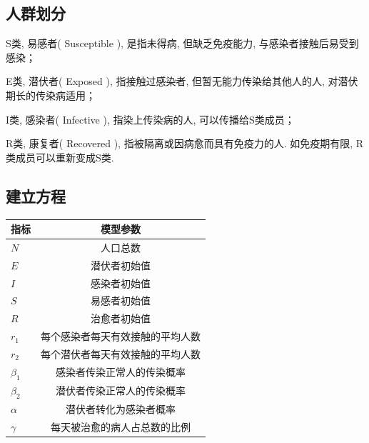 \documentclass[lang=cn,11pt]{elegantpaper}
\begin{document}
\subsection{人群划分}
S类, 易感者( Susceptible ), 是指未得病, 但缺乏免疫能力, 与感染者接触后易受到感染；

E类, 潜伏者( Exposed ), 指接触过感染者, 但暂无能力传染给其他人的人, 对潜伏期长的传染病适用；

I类, 感染者( Infective ), 指染上传染病的人, 可以传播给S类成员；

R类, 康复者( Recovered ), 指被隔离或因病愈而具有免疫力的人. 如免疫期有限, R类成员可以重新变成S类.



\subsection{建立方程}
\begin{center}	
    \begin{tabular}{l c}
      \hline
      指标 & 模型参数 \\
      \hline
      $N$&人口总数    \\
      $E$&潜伏者初始值\\
      $I$&感染者初始值\\
      $S$&易感者初始值\\
      $R$& 治愈者初始值 \\
      $r_1$&每个感染者每天有效接触的平均人数\\
      $r_2$&每个潜伏者每天有效接触的平均人数\\
      $\beta_1$&感染者传染正常人的传染概率\\
      $\beta_2$&潜伏者传染正常人的传染概率\\
      $\alpha$&潜伏者转化为感染者概率 \\
      $\gamma$&每天被治愈的病人占总数的比例\\    
      \hline
    \end{tabular}
 \end{center}
 
\end{document}
